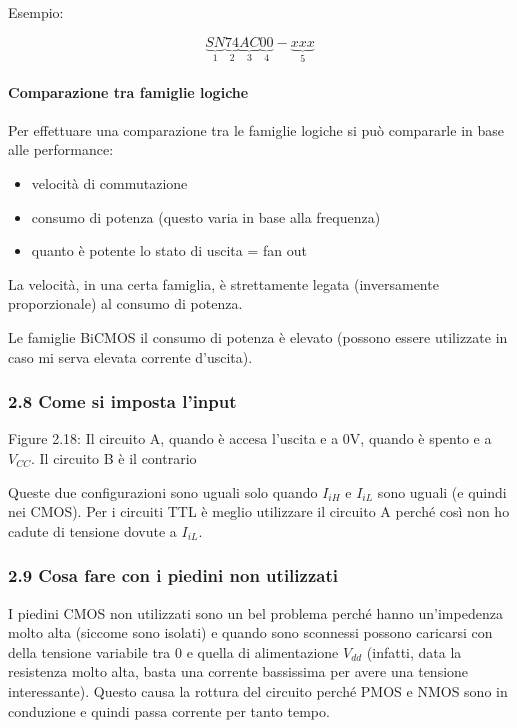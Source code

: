 \documentclass[
]{article}
\providecommand{\tightlist}{%
  \setlength{\itemsep}{0pt}\setlength{\parskip}{0pt}}
\begin{document}
Esempio:

\[\underbrace{SN}_{1}\underbrace{74}_{2}\underbrace{AC}_{3}\underbrace{00}_{4}-
\underbrace{xxx}_{5}\]

\paragraph{Comparazione tra famiglie
logiche}\label{comparazione-tra-famiglie-logiche}

Per effettuare una comparazione tra le famiglie logiche si può
compararle in base alle performance:

\begin{itemize}
\tightlist
\item
  velocità di commutazione
\item
  consumo di potenza (questo varia in base alla frequenza)
\item
  quanto è potente lo stato di uscita = fan out
\end{itemize}

La velocità, in una certa famiglia, è strettamente legata (inversamente
proporzionale) al consumo di potenza.

Le famiglie BiCMOS il consumo di potenza è elevato (possono essere
utilizzate in caso mi serva elevata corrente d'uscita).

\subsubsection{2.8 Come si imposta
l'input}\label{come-si-imposta-linput}

Figure 2.18: Il circuito A, quando è accesa l'uscita e a 0V, quando è
spento e a \(V_{CC}\). Il circuito B è il contrario

Queste due configurazioni sono uguali solo quando \(I_{iH}\) e
\(I_{iL}\) sono uguali (e quindi nei CMOS). Per i circuiti TTL è meglio
utilizzare il circuito A perché così non ho cadute di tensione dovute a
\(I_{iL}\).

\subsubsection{2.9 Cosa fare con i piedini non
utilizzati}\label{cosa-fare-con-i-piedini-non-utilizzati}

I piedini CMOS non utilizzati sono un bel problema perché hanno
un'impedenza molto alta (siccome sono isolati) e quando sono sconnessi
possono caricarsi con della tensione variabile tra 0 e quella di
alimentazione \(V_{dd}\) (infatti, data la resistenza molto alta, basta
una corrente bassissima per avere una tensione interessante). Questo
causa la rottura del circuito perché PMOS e NMOS sono in conduzione e
quindi passa corrente per tanto tempo.
\end{document}
